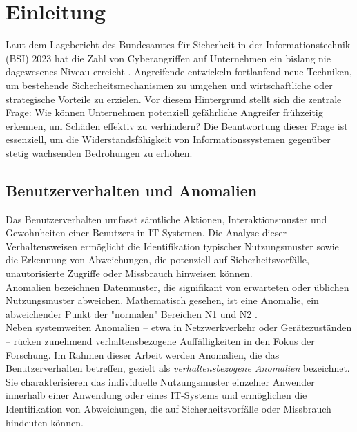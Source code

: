\documentclass[a4paper,12pt]{article}
\begin{document}
	
	
	

	\printglossaries 
	\newpage
	\clearpage

	\section{Einleitung}
	Laut dem Lagebericht des Bundesamtes für Sicherheit in der Informationstechnik (BSI) 2023 hat die Zahl von Cyberangriffen auf Unternehmen ein bislang nie dagewesenes Niveau erreicht \cite{bsi2023}. Angreifende entwickeln fortlaufend neue Techniken, um bestehende Sicherheitsmechanismen zu umgehen und wirtschaftliche oder strategische Vorteile zu erzielen. Vor diesem Hintergrund stellt sich die zentrale Frage: Wie können Unternehmen potenziell gefährliche Angreifer frühzeitig erkennen, um Schäden effektiv zu verhindern? Die Beantwortung dieser Frage ist essenziell, um die Widerstandsfähigkeit von Informationssystemen gegenüber stetig wachsenden Bedrohungen zu erhöhen.
	
	\subsection{Benutzerverhalten und Anomalien}
	Das Benutzerverhalten umfasst sämtliche Aktionen, Interaktionsmuster und Gewohnheiten einer Benutzers in IT-Systemen. Die Analyse dieser Verhaltensweisen ermöglicht die Identifikation typischer Nutzungsmuster sowie die Erkennung von Abweichungen, die potenziell auf Sicherheitsvorfälle, unautorisierte Zugriffe oder Missbrauch hinweisen können.
	\\[0.5em]
	Anomalien bezeichnen Datenmuster, die signifikant von erwarteten oder üblichen Nutzungsmuster abweichen. Mathematisch gesehen, ist eine Anomalie, ein abweichender Punkt der "normalen"  Bereichen N1 und N2 \cite[S.2]{chandola2009anomaly}. 
	\\[0.5em]
	Neben systemweiten Anomalien – etwa in Netzwerkverkehr oder Gerätezuständen – rücken zunehmend verhaltensbezogene Auffälligkeiten in den Fokus der Forschung. Im Rahmen dieser Arbeit werden Anomalien, die das Benutzerverhalten betreffen, gezielt als \textit{verhaltensbezogene Anomalien} bezeichnet. Sie charakterisieren das individuelle Nutzungsmuster einzelner Anwender innerhalb einer Anwendung oder eines IT-Systems und ermöglichen die Identifikation von Abweichungen, die auf Sicherheitsvorfälle oder Missbrauch hindeuten können.
		
\end{document}
